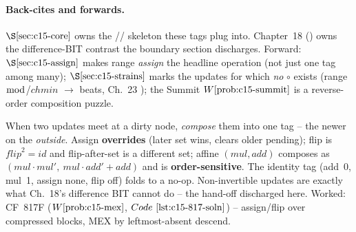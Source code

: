 \paragraph{Back-cites and forwards.}
\(\secref{c15-core}\) owns the // skeleton these tags plug into.  Chapter~18 () owns the difference-BIT contrast the boundary section discharges.  Forward: \(\secref{c15-assign}\) makes range \emph{assign} the headline operation (not just one tag among many); \(\secref{c15-strains}\) marks the updates for which \emph{no} \(\circ\) exists (range \(\bmod\)/\(\mathit{chmin}\) \(\to\) beats, Ch.~23 ); the Summit \(\probref{c15-summit}\) is a reverse-order composition puzzle.

\begin{recallbox}
When two updates meet at a dirty node, \emph{compose} them into one tag -- the newer on the \emph{outside}.  Assign \textbf{overrides} (later set wins, clears older pending); flip is \(\mathit{flip}^2=\mathit{id}\) and flip-after-set is a different set; affine \((\mathit{mul},\mathit{add})\) composes as \((\mathit{mul}\cdot\mathit{mul}',\ \mathit{mul}\cdot\mathit{add}'+\mathit{add})\) and is \textbf{order-sensitive}.  The identity tag (add~0, mul~1, assign none, flip off) folds to a no-op.  Non-invertible updates are exactly what Ch.~18's difference BIT cannot do -- the hand-off discharged here.  Worked: CF~817F (\(\probref{c15-mex}\), \(\coderef{c15-817-soln}\)) -- assign/flip over compressed blocks, MEX by leftmost-absent descend.
\end{recallbox}
